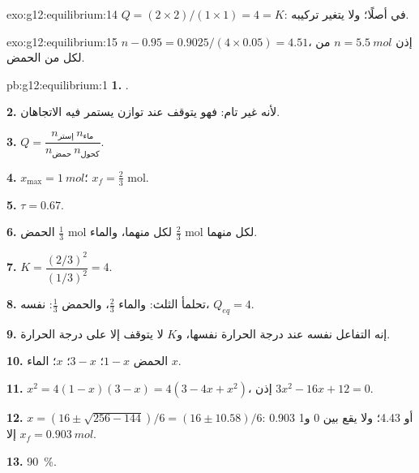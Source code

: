 \begin{solution}{exo:g12:equilibrium:14}
$Q = (2 \times 2)/(1 \times 1) = 4 = K$:  في  أصلًا؛ ولا يتغير تركيبه.
\end{solution}

\begin{solution}{exo:g12:equilibrium:15}
$n - 0.95 = 0.9025 / (4 \times 0.05) = 4.51$، إذن $n = \qty{5.5}{mol}$ من
 لكل  من الحمض.
\end{solution}

\begin{solution}{pb:g12:equilibrium:1}
\textbf{1.} .

\textbf{2.} لأنه غير تام: فهو يتوقف عند توازن يستمر فيه
الاتجاهان.

\textbf{3.} $Q = \dfrac{n_{\text{إستر}}\, n_{\text{ماء}}}{n_{\text{حمض}}\, n_{\text{كحول}}}$.

\textbf{4.} $x_{\max} = \qty{1}{mol}$؛ $x_f = \frac{2}{3}$ mol.

\textbf{5.} $\tau = 0.67$.

\textbf{6.} الحمض  $\frac{1}{3}$ mol لكل منهما،  والماء
$\frac{2}{3}$ mol لكل منهما.

\textbf{7.} $K = \dfrac{(2/3)^2}{(1/3)^2} = 4$.

\textbf{8.} تحلمأ الثلث:  والماء $\frac{2}{3}$، والحمض
 $\frac{1}{3}$:  نفسه، $Q_{eq} = 4$.

\textbf{9.} إنه التفاعل نفسه عند درجة الحرارة نفسها، و$K$
لا يتوقف إلا على درجة الحرارة.

\textbf{10.} الحمض $1 - x$؛  $3 - x$؛  $x$؛ الماء $x$.

\textbf{11.} $x^2 = 4(1 - x)(3 - x) = 4(3 - 4x + x^2)$، إذن
$3x^2 - 16x + 12 = 0$.

\textbf{12.} $x = (16 \pm \sqrt{256 - 144})/6 = (16 \pm 10.58)/6$: 0.903
أو 4.43؛ ولا يقع بين 0 و1 إلا $x_f = \qty{0.903}{mol}$.

\textbf{13.} \qty{90}{\percent}.


\end{solution}
